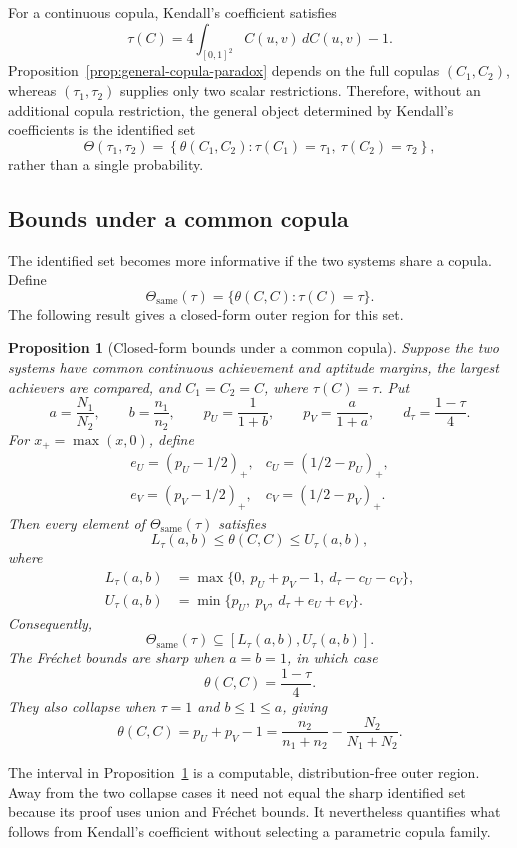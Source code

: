 \documentclass[12pt]{article}
\newtheorem{prop}[theorem]{Proposition}
\begin{document}
For a continuous copula, Kendall's coefficient satisfies
\[
\tau(C)=4\int_{[0,1]^2}C(u,v)\,dC(u,v)-1.
\]
Proposition~\ref{prop:general-copula-paradox} depends on the full copulas
\((C_1,C_2)\), whereas \((\tau_1,\tau_2)\) supplies only two scalar
restrictions.  Therefore, without an additional copula restriction, the
general object determined by Kendall's coefficients is the identified set
\[
\Theta(\tau_1,\tau_2)
=
\left\{
\theta(C_1,C_2):\tau(C_1)=\tau_1,\ \tau(C_2)=\tau_2
\right\},
\]
rather than a single probability.
\subsection{Bounds under a common copula}

The identified set becomes more informative if the two systems share a
copula. Define
\[
\Theta_{\mathrm{same}}(\tau)
=
\{\theta(C,C):\tau(C)=\tau\}.
\]
The following result gives a closed-form outer region for this set.

\begin{prop}[Closed-form bounds under a common copula]
\label{prop:common-copula-bounds}
Suppose the two systems have common continuous achievement and aptitude
margins, the largest achievers are compared, and \(C_1=C_2=C\), where
\(\tau(C)=\tau\). Put
\[
a=\frac{N_1}{N_2},\qquad b=\frac{n_1}{n_2},\qquad
p_U=\frac{1}{1+b},\qquad p_V=\frac{a}{1+a},\qquad
d_\tau=\frac{1-\tau}{4}.
\]
For \(x_+=\max(x,0)\), define
\[
\begin{array}{ll}
e_U=(p_U-1/2)_+, & c_U=(1/2-p_U)_+,\\
e_V=(p_V-1/2)_+, & c_V=(1/2-p_V)_+.
\end{array}
\]
Then every element of \(\Theta_{\mathrm{same}}(\tau)\) satisfies
\[
L_\tau(a,b)\leq \theta(C,C)\leq U_\tau(a,b),
\]
where
\[
\begin{aligned}
L_\tau(a,b)
&=\max\{0,\ p_U+p_V-1,\ d_\tau-c_U-c_V\},\\
U_\tau(a,b)
&=\min\{p_U,\ p_V,\ d_\tau+e_U+e_V\}.
\end{aligned}
\]
Consequently,
\[
\Theta_{\mathrm{same}}(\tau)
\subseteq [L_\tau(a,b),U_\tau(a,b)].
\]
The Fr\'echet bounds are sharp when \(a=b=1\), in which case
\[
\theta(C,C)=\frac{1-\tau}{4}.
\]
They also collapse when \(\tau=1\) and \(b\leq1\leq a\), giving
\[
\theta(C,C)=p_U+p_V-1
=\frac{n_2}{n_1+n_2}-\frac{N_2}{N_1+N_2}.
\]
\end{prop}

The interval in Proposition~\ref{prop:common-copula-bounds} is a computable,
distribution-free outer region. Away from the two collapse cases it need not
equal the sharp identified set because its proof uses union and Fr\'echet
bounds. It nevertheless quantifies what follows from Kendall's coefficient
without selecting a parametric copula family.
\end{document}
